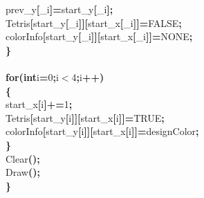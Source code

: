 \documentclass[a4paper, 10pt]{article}
\newcommand\SPC{\hspace*{0.6em}}
\newcommand{\CppAIdentifier}[1]{#1}
\newcommand{\CppANumber}[1]{\textcolor[rgb]{0.5,0,0.5}{#1}}
\newcommand{\CppAReservedWord}[1]{\textbf{#1}}
\newcommand{\CppASpace}[1]{\colorbox[rgb]{1,1,1}{#1}}
\newcommand{\CppASymbol}[1]{\textbf{\textcolor[rgb]{1,0,0}{#1}}}
\begin{document}
\begin{ttfamily}
\CppASpace{\SPC \SPC }\CppAIdentifier{prev\_y}\CppASymbol{[}\CppAIdentifier{\_i}\CppASymbol{]}\CppASymbol{=}\CppAIdentifier{start\_y}\CppASymbol{[}\CppAIdentifier{\_i}\CppASymbol{]}\CppASymbol{;}\\
\CppASpace{\SPC \SPC }\CppAIdentifier{Tetris}\CppASymbol{[}\CppAIdentifier{start\_y}\CppASymbol{[}\CppAIdentifier{\_i}\CppASymbol{]}\CppASymbol{]}\CppASymbol{[}\CppAIdentifier{start\_x}\CppASymbol{[}\CppAIdentifier{\_i}\CppASymbol{]}\CppASymbol{]}\CppASymbol{=}\CppAIdentifier{FALSE}\CppASymbol{;}\\
\CppASpace{\SPC \SPC }\CppAIdentifier{colorInfo}\CppASymbol{[}\CppAIdentifier{start\_y}\CppASymbol{[}\CppAIdentifier{\_i}\CppASymbol{]}\CppASymbol{]}\CppASymbol{[}\CppAIdentifier{start\_x}\CppASymbol{[}\CppAIdentifier{\_i}\CppASymbol{]}\CppASymbol{]}\CppASymbol{=}\CppAIdentifier{NONE}\CppASymbol{;}\\
\CppASpace{\SPC }\CppASymbol{\}}\\
\\
\CppASpace{\SPC }\CppAReservedWord{for}\CppASymbol{(}\CppAReservedWord{int}\CppASpace{\SPC }\CppAIdentifier{i}\CppASymbol{=}\CppANumber{0}\CppASymbol{;}\CppAIdentifier{i}\CppASymbol{$<$}\CppANumber{4}\CppASymbol{;}\CppAIdentifier{i}\CppASymbol{++}\CppASymbol{)}\\
\CppASpace{\SPC }\CppASymbol{\{}\\
\CppASpace{\SPC \SPC }\CppAIdentifier{start\_x}\CppASymbol{[}\CppAIdentifier{i}\CppASymbol{]}\CppASymbol{+=}\CppANumber{1}\CppASymbol{;}\\
\CppASpace{\SPC \SPC }\CppAIdentifier{Tetris}\CppASymbol{[}\CppAIdentifier{start\_y}\CppASymbol{[}\CppAIdentifier{i}\CppASymbol{]}\CppASymbol{]}\CppASymbol{[}\CppAIdentifier{start\_x}\CppASymbol{[}\CppAIdentifier{i}\CppASymbol{]}\CppASymbol{]}\CppASymbol{=}\CppAIdentifier{TRUE}\CppASymbol{;}\\
\CppASpace{\SPC \SPC }\CppAIdentifier{colorInfo}\CppASymbol{[}\CppAIdentifier{start\_y}\CppASymbol{[}\CppAIdentifier{i}\CppASymbol{]}\CppASymbol{]}\CppASymbol{[}\CppAIdentifier{start\_x}\CppASymbol{[}\CppAIdentifier{i}\CppASymbol{]}\CppASymbol{]}\CppASymbol{=}\CppAIdentifier{designColor}\CppASymbol{;}\\
\CppASpace{\SPC }\CppASymbol{\}}\\
\CppASpace{\SPC }\CppAIdentifier{Clear}\CppASymbol{(}\CppASymbol{)}\CppASymbol{;}\\
\CppASpace{\SPC }\CppAIdentifier{Draw}\CppASymbol{(}\CppASymbol{)}\CppASymbol{;}\\
\CppASymbol{\}}\\

\end{ttfamily}
\end{document}
